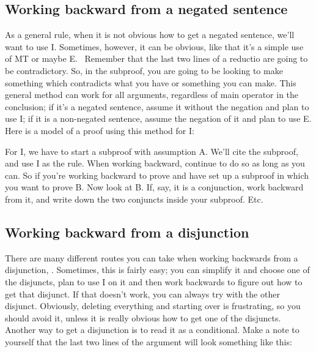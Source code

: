 \subsection{Working backward from a negated sentence}

As a general rule, when it is not obvious how to get a negated sentence, we'll want to use \enot I. Sometimes, however, it can be obvious, like that it's a simple use of MT or maybe \eif E.  Remember that the last two lines of a reductio are going to be contradictory. So, in the subproof, you are going to be looking to make something which contradicts what you have or something you can make. This general method can work for all arguments, regardless of main operator in the conclusion; if it's a negated sentence, assume it without the negation and plan to use \enot I; if it is a non-negated sentence, assume the negation of it and plan to use \enot E. Here is a model of a proof using this method for \enot I:
\begin{fitchproof}
\ellipsesline			
{}			
\open
{}			
\ellipsesline		
{}	
\close
{}	
\end{fitchproof}

For \enot I, we have to start a subproof with assumption A. We’ll cite the subproof, and use \enot I as the rule. When working backward, continue to do so as long as you can. So if you’re working backward to prove \eif{} and have set up a subproof in which you want to prove B. Now look at B. If, say, it is a conjunction, work backward from it, and write down the two conjuncts inside your subproof. Etc.

\subsection{Working backward from a disjunction}

There are many different routes you can take when working backwards from a disjunction, \eor{}. Sometimes, this is fairly easy; you can simplify it and choose one of the disjuncts, plan to use \eor I on it and then work backwards to figure out how to get that disjunct. If that doesn't work, you can always try with the other disjunct. Obviously, deleting everything and starting over is frustrating, so you should avoid it, unless it is really obvious how to get one of the disjuncts. Another way to get a disjunction is to read it as a conditional. Make a note to yourself that the last two lines of the argument will look something like this:
\begin{fitchproof}
 {}
\end{fitchproof}

